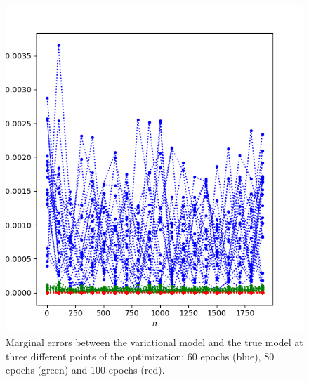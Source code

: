\documentclass{article}
\begin{document}
\begin{figure}
  \centering
  \includegraphics[width=\linewidth, height=0.6\textwidth]{images/marginal_2.png}
  \caption{Marginal errors between the variational model and the true model at three different points of the optimization: 60 epochs (blue), 80 epochs (green) and 100 epochs (red).}
  \label{fig:marginal_linear_gaussian_appendix}
\end{figure}%
\end{document}
